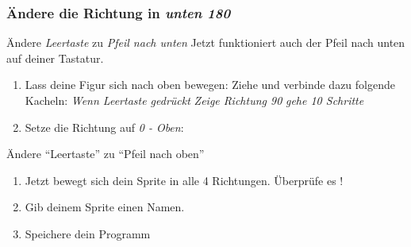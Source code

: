 \subsubsection{Ändere die Richtung in \textit{unten 180}}
Ändere \textit{Leertaste} zu \textit{Pfeil nach unten}
Jetzt funktioniert auch der Pfeil nach unten auf deiner Tastatur. 
\begin{enumerate}

\item Lass deine Figur sich nach oben bewegen: Ziehe und verbinde dazu folgende Kacheln:
\subitem \textit{Wenn Leertaste gedrückt}
\subitem \textit{Zeige Richtung 90}
\subitem \textit{gehe 10 Schritte}
\item Setze die Richtung auf  \textit{0 - Oben}:
\end{enumerate}
Ändere “Leertaste” zu “Pfeil nach oben”

\begin{enumerate}
\item Jetzt bewegt sich dein Sprite in alle 4 Richtungen. Überprüfe es !
\item Gib deinem Sprite einen Namen.
\item Speichere dein Programm
\end{enumerate}